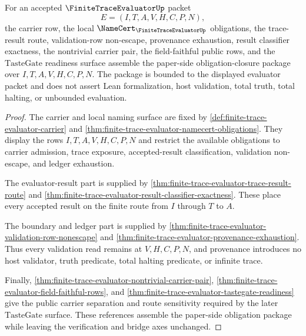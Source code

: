 \begin{theorem}
\label{thm:finite-trace-evaluator-obligation-closure-status}
For an accepted $\FiniteTraceEvaluatorUp$ packet
$$
E=(I,T,A,V,H,C,P,N),
$$
the carrier row, the local $\NameCert_{\FiniteTraceEvaluatorUp}$ obligations,
the trace-result route, validation-row non-escape, provenance exhaustion,
result classifier exactness, the nontrivial carrier pair, the field-faithful
public rows, and the $\mathrm{TasteGate}$ readiness surface assemble the
paper-side obligation-closure package over $I,T,A,V,H,C,P,N$. The package is
bounded to the displayed evaluator packet and does not assert Lean
formalization, host validation, total truth, total halting, or unbounded
evaluation.
\end{theorem}
\begin{proof}
The carrier and local naming surface are fixed by
\autoref{def:finite-trace-evaluator-carrier} and
\autoref{thm:finite-trace-evaluator-namecert-obligations}. They display the
rows $I,T,A,V,H,C,P,N$ and restrict the available obligations to carrier
admission, trace exposure, accepted-result classification, validation
non-escape, and ledger exhaustion.

The evaluator-result part is supplied by
\autoref{thm:finite-trace-evaluator-trace-result-route} and
\autoref{thm:finite-trace-evaluator-result-classifier-exactness}. These place
every accepted result on the finite route from $I$ through $T$ to $A$.

The boundary and ledger part is supplied by
\autoref{thm:finite-trace-evaluator-validation-row-nonescape} and
\autoref{thm:finite-trace-evaluator-provenance-exhaustion}. Thus every
validation read remains at $V,H,C,P,N$, and provenance introduces no host
validator, truth predicate, total halting predicate, or infinite trace.

Finally,
\autoref{thm:finite-trace-evaluator-nontrivial-carrier-pair},
\autoref{thm:finite-trace-evaluator-field-faithful-rows}, and
\autoref{thm:finite-trace-evaluator-tastegate-readiness} give the public
carrier separation and route sensitivity required by the later
$\mathrm{TasteGate}$ surface. These references assemble the paper-side
obligation package while leaving the verification and bridge axes unchanged.
\end{proof}
